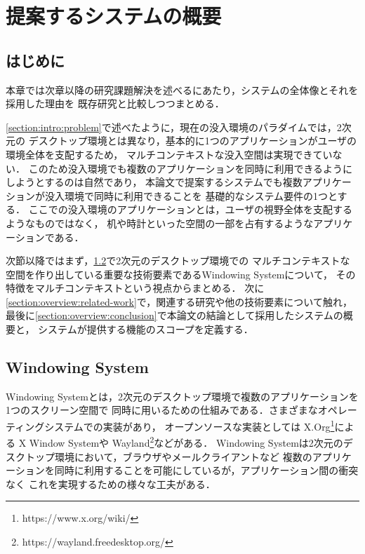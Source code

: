 \chapter{提案するシステムの概要}


\section{はじめに}

本章では次章以降の研究課題解決を述べるにあたり，システムの全体像とそれを採用した理由を
既存研究と比較しつつまとめる．

\ref{section:intro:problem}で述べたように，現在の没入環境のパラダイムでは，2次元の
デスクトップ環境とは異なり，基本的に1つのアプリケーションがユーザの環境全体を支配するため，
マルチコンテキストな没入空間は実現できていない．
このため没入環境でも複数のアプリケーションを同時に利用できるようにしようとするのは自然であり，
本論文で提案するシステムでも複数アプリケーションが没入環境で同時に利用できることを
基礎的なシステム要件の1つとする．
ここでの没入環境のアプリケーションとは，ユーザの視野全体を支配するようなものではなく，
机や時計といった空間の一部を占有するようなアプリケーションである．

次節以降ではまず，\ref{section:overview:windowing-system}で2次元のデスクトップ環境での
マルチコンテキストな空間を作り出している重要な技術要素であるWindowing Systemについて，
その特徴をマルチコンテキストという視点からまとめる．
次に\ref{section:overview:related-work}で，関連する研究や他の技術要素について触れ，
最後に\ref{section:overview:conclusion}で本論文の結論として採用したシステムの概要と，
システムが提供する機能のスコープを定義する．

\section{Windowing System}
\label{section:overview:windowing-system}

Windowing Systemとは，2次元のデスクトップ環境で複数のアプリケーションを1つのスクリーン空間で
同時に用いるための仕組みである．さまざまなオペレーティングシステムでの実装があり，
オープンソースな実装としては X.Org\footnote{https://www.x.org/wiki/}による
X Window System\cite{x-window-system}や
Wayland\footnote{https://wayland.freedesktop.org/}などがある．
Windowing Systemは2次元のデスクトップ環境において，ブラウザやメールクライアントなど
複数のアプリケーションを同時に利用することを可能にしているが，アプリケーション間の衝突なく
これを実現するための様々な工夫がある．

